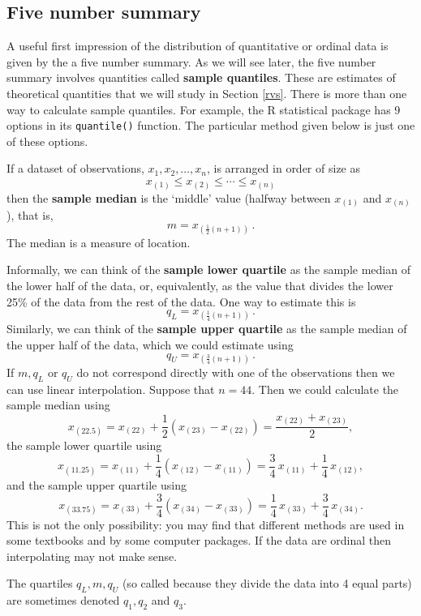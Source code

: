 \documentclass[
  british,
]{book}
\begin{document}
\hypertarget{five-number-summary}{%
\subsection{Five number summary}\label{five-number-summary}}

A useful first impression of the distribution of quantitative or ordinal data is given by the a five number summary. As we will see later, the five number summary involves quantities called \textbf{sample quantiles}. These are estimates of theoretical quantities that we will study in Section \ref{rvs}. There is more than one way to calculate sample quantiles. For example, the R statistical package has 9 options in its \texttt{quantile()} function. The particular method given below is just one of these options.

If a dataset of observations, \(x_1,x_2,\ldots,x_n\), is arranged in order of size as \[ x_{(1)} \leq x_{(2)} \leq \cdots \leq x_{(n)}\] then the \textbf{sample median} is the `middle' value (halfway between \(x_{(1)}\) and \(x_{(n)}\)), that is,
\[ m=x_{(\frac{1}{2}(n+1))}\,.\]
The median is a measure of location.

Informally, we can think of the \textbf{sample lower quartile} as the sample median of the lower half of the data, or, equivalently, as the value that divides the lower 25\% of the data from the rest of the data. One way to estimate this is
\[ q_L=x_{(\frac{1}{4}(n+1))} \,.\]
Similarly, we can think of the \textbf{sample upper quartile} as the sample median of the upper half of the data, which we could estimate using
\[ q_U=x_{(\frac{3}{4}(n+1))}\,.\]
If \(m, q_L\) or \(q_U\) do not correspond directly with one of the observations
then we can use linear interpolation. Suppose that \(n=44\). Then we could calculate the sample median using
\[x_{(22.5)}=x_{(22)}+\frac12\left(x_{(23)}-
x_{(22)}\right)=\frac{x_{(22)}+x_{(23)}}{2}, \]
the sample lower quartile using
\[ x_{(11.25)}=x_{(11)}+\frac14\left(x_{(12)}-
x_{(11)}\right)=\frac34\,x_{(11)}+\frac14\,x_{(12)}, \]
and the sample upper quartile using
\[x_{(33.75)}=x_{(33)}+\frac34\left(x_{(34)}-
x_{(33)}\right)=\frac14\,x_{(33)}+\frac34\,x_{(34)}.\]
This is not the only possibility: you may find that different methods are used in some textbooks and by some computer packages. If the data are ordinal then interpolating may not make sense.

The quartiles \(q_L, m, q_U\) (so called because they divide the data into 4 equal parts) are sometimes denoted \(q_1, q_2\) and \(q_3\).
\end{document}
